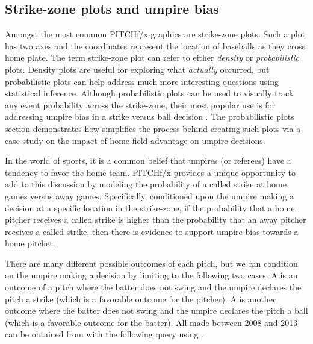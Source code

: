 \begin{article}
\subsection{Strike-zone plots and umpire bias}
Amongst the most common PITCHf/x graphics are strike-zone plots. Such
a plot has two axes and the coordinates represent the location of
baseballs as they cross home plate. The term strike-zone plot can
refer to either \emph{density} or \emph{probabilistic} plots. Density
plots are useful for exploring what \emph{actually} occurred, but
probabilistic plots can help address much more interesting questions
using statistical inference. Although probabilistic plots can be used
to visually track any event probability across the strike-zone, their
most popular use is for addressing umpire bias in a strike versus
ball decision \citet{bias}. The probabilistic plots section demonstrates
how  simplifies the process behind creating such plots
via a case study on the impact of home field advantage on umpire decisions.

In the world of sports, it is a common belief that umpires (or referees)
have a tendency to favor the home team. PITCHf/x provides a unique
opportunity to add to this discussion by modeling the probability
of a called strike at home games versus away games. Specifically,
conditioned upon the umpire making a decision at a specific location
in the strike-zone, if the probability that a home pitcher receives
a called strike is higher than the probability that an away pitcher
receives a called strike, then there is evidence to support umpire
bias towards a home pitcher.

There are many different possible outcomes of each pitch, but we can
condition on the umpire making a decision by limiting to the following
two cases. A  is an outcome of a pitch where the
batter does not swing and the umpire declares the pitch a strike (which
is a favorable outcome for the pitcher). A  is another
outcome where the batter does not swing and the umpire declares the
pitch a ball (which is a favorable outcome for the batter). All 
made between 2008 and 2013 can be obtained from  with the
following query using .
%
\begin{Schunk}
\end{Schunk}
\end{article}
